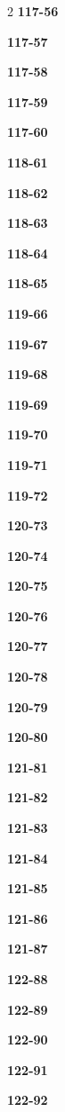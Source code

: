 \documentclass[10pt,a4paper]{article}
\begin{document}
\begin{multicols}{2}
\noindent\textbf{117-56}\ \par
\noindent\textbf{117-57}\ \par
\noindent\textbf{117-58}\ \par
\noindent\textbf{117-59}\ \par
\noindent\textbf{117-60}\ \par
\noindent\textbf{118-61}\ \par
\noindent\textbf{118-62}\ \par
\noindent\textbf{118-63}\ \par
\noindent\textbf{118-64}\ \par
\noindent\textbf{118-65}\ \par
\noindent\textbf{119-66}\ \par
\noindent\textbf{119-67}\ \par
\noindent\textbf{119-68}\ \par
\noindent\textbf{119-69}\ \par
\noindent\textbf{119-70}\ \par
\noindent\textbf{119-71}\ \par
\noindent\textbf{119-72}\ \par
\noindent\textbf{120-73}\ \par
\noindent\textbf{120-74}\ \par
\noindent\textbf{120-75}\ \par
\noindent\textbf{120-76}\ \par
\noindent\textbf{120-77}\ \par
\noindent\textbf{120-78}\ \par
\noindent\textbf{120-79}\ \par
\noindent\textbf{120-80}\ \par
\noindent\textbf{121-81}\ \par
\noindent\textbf{121-82}\ \par
\noindent\textbf{121-83}\ \par
\noindent\textbf{121-84}\ \par
\noindent\textbf{121-85}\ \par
\noindent\textbf{121-86}\ \par
\noindent\textbf{121-87}\ \par
\noindent\textbf{122-88}\ \par
\noindent\textbf{122-89}\ \par
\noindent\textbf{122-90}\ \par
\noindent\textbf{122-91}\ \par
\noindent\textbf{122-92}\ \par

\end{multicols}
\end{document}
